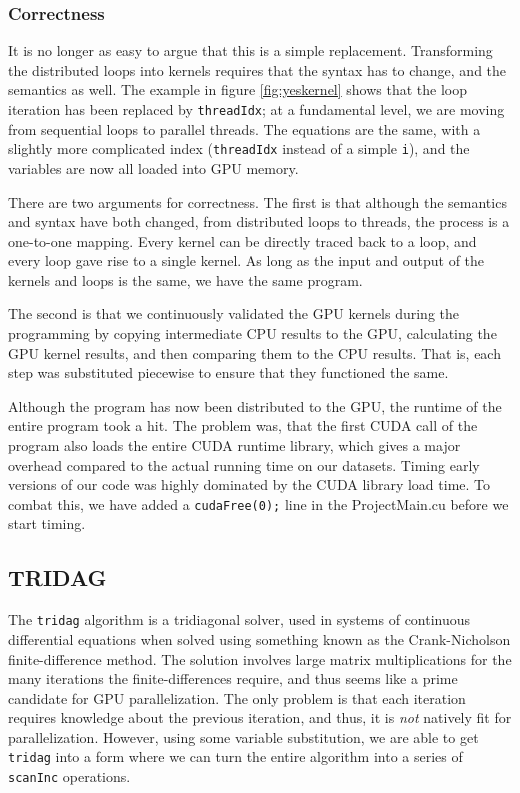 \documentclass[12pt, oneside]{article}
\begin{document}
\subsubsection{Correctness}
It is no longer as easy to argue that this is a simple replacement. Transforming the distributed loops into kernels requires that the syntax has to change, and the semantics as well. The example in figure \ref{fig:yeskernel} shows that the loop iteration has been replaced by \texttt{threadIdx}; at a fundamental level, we are moving from sequential loops to parallel threads. The equations are the same, with a slightly more complicated index (\texttt{threadIdx} instead of a simple \texttt{i}), and the variables are now all loaded into GPU memory.
						
There are two arguments for correctness. The first is that although the semantics and syntax have both changed, from distributed loops to threads, the process is a one-to-one mapping. Every kernel can be directly traced back to a loop, and every loop gave rise to a single kernel. As long as the input and output of the kernels and loops is the same, we have the same program.
						
The second is that we continuously validated the GPU kernels during the programming by copying intermediate CPU results to the GPU, calculating the GPU kernel results, and then comparing them to the CPU results. That is, each step was substituted piecewise to ensure that they functioned the same.
						
Although the program has now been distributed to the GPU, the runtime of the entire program took a hit. The problem was, that the first CUDA call of the program also loads the entire CUDA runtime library, which gives a major overhead compared to the actual running time on our datasets. Timing early versions of our code was highly dominated by the CUDA library load time. To combat this, we have added a \texttt{cudaFree(0);} line in the ProjectMain.cu before we start timing.
\subsection{TRIDAG}
The \texttt{tridag} algorithm is a tridiagonal solver, used in systems of continuous differential equations when solved using something known as the Crank-Nicholson finite-difference method. The solution involves large matrix multiplications for the many iterations the finite-differences require, and thus seems like a prime candidate for GPU parallelization. The only problem is that each iteration requires knowledge about the previous iteration, and thus, it is \emph{not} natively fit for parallelization. However, using some variable substitution, we are able to get \texttt{tridag} into a form where we can turn the entire algorithm into a series of \texttt{scanInc} operations.
\end{document}
